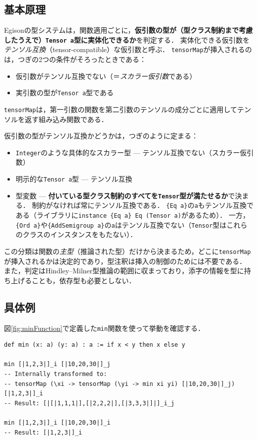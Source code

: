 \subsection{基本原理}

Egisonの型システムは，関数適用ごとに，\textbf{仮引数の型が（型クラス制約まで考慮したうえで）\lstinline{Tensor a}型に実体化できるか}を判定する．
実体化できる仮引数を\emph{テンソル互換}（tensor-compatible）な仮引数と呼ぶ．
\lstinline{tensorMap}が挿入されるのは，つぎの2つの条件がそろったときである：
\begin{itemize}
\item 仮引数がテンソル互換でない（＝\emph{スカラー仮引数}である）
\item 実引数の型が\lstinline{Tensor a}型である
\end{itemize}
\lstinline{tensorMap}は，第一引数の関数を第二引数のテンソルの成分ごとに適用してテンソルを返す組み込み関数である．

仮引数の型がテンソル互換かどうかは，つぎのように定まる：
\begin{itemize}
\item \lstinline{Integer}のような具体的なスカラー型 --- テンソル互換でない（スカラー仮引数）
\item 明示的な\lstinline{Tensor a}型 --- テンソル互換
\item 型変数 --- \textbf{付いている型クラス制約のすべてを\lstinline{Tensor}型が満たせるか}で決まる．
制約がなければ常にテンソル互換である．
\lstinline|{Eq a}|の\lstinline{a}もテンソル互換である（ライブラリに\lstinline|instance {Eq a} Eq (Tensor a)|があるため）．
一方，\lstinline|{Ord a}|や\lstinline|{AddSemigroup a}|の\lstinline{a}はテンソル互換でない（\lstinline{Tensor}型はこれらのクラスのインスタンスをもたない）．
\end{itemize}
この分類は関数の\emph{主型}（推論された型）だけから決まるため，どこに\lstinline{tensorMap}が挿入されるかは決定的であり，型注釈は挿入の制御のためには不要である．
また，判定はHindley--Milner型推論の範囲に収まっており，添字の情報を型に持ち上げることも，依存型も必要としない．

\subsection{具体例}

図\ref{fig:minFunction}で定義した\lstinline{min}関数を使って挙動を確認する．
\begin{lstlisting}[language=egison,numbers=none]
def min (x: a) (y: a) : a := if x < y then x else y

min [|1,2,3|]_i [|10,20,30|]_j
-- Internally transformed to:
-- tensorMap (\xi -> tensorMap (\yi -> min xi yi) [|10,20,30|]_j) [|1,2,3|]_i
-- Result: [|[|1,1,1|],[|2,2,2|],[|3,3,3|]|]_i_j

min [|1,2,3|]_i [|10,20,30|]_i
-- Result: [|1,2,3|]_i
\end{lstlisting}

